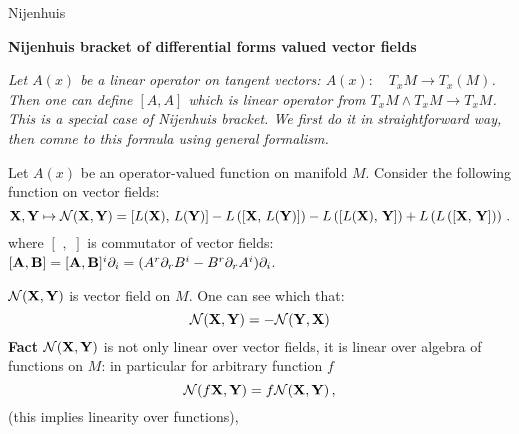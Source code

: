 Nijenhuis 

\baselineskip=14pt


\def\vare {\varepsilon}
\def\A {{\bf A}}
\def\B {{\bf B}}
\def\t {\tilde}
\def\a {\alpha}
\def\K {{\bf K}}
\def\N {{\bf N}}
\def\V {{\cal V}}
\def\L {{\cal L}}
\def\s {{\sigma}}
\def\S {{\Sigma}}
\def\s {{\sigma}}
\def\p{\partial}
\def\vare{{\varepsilon}}
\def\Q {{\bf Q}}
\def\O {{\bf O}}
\def\D {{\cal D}}
\def\G {{\Gamma}}
\def\C {{\bf C}}
\def\N {{\cal N}}
\def\Z {{\bf Z}}
\def\U  {{\cal U}}
\def\H {{\cal H}}
\def\R  {{\bf R}}
\def\S  {{\bf S}}
\def\E  {{\bf E}}
\def\l {\lambda}
\def\degree {{\bf {\rm degree}\,\,}}
\def \finish {${\,\,\vrule height1mm depth2mm width 8pt}$}
\def \m {\medskip}
\def\p {\partial}
\def\r {{\bf r}}
\def\v {{\bf v}}
\def\n {{\bf n}}
\def\t {{\bf t}}
\def\b {{\bf b}}
\def\c {{\bf c }}
\def\e{{\bf e}}
\def\ac {{\bf a}}
\def \X   {{\bf X}}
\def \Y   {{\bf Y}}
\def \x   {{\bf x}}
\def \y   {{\bf y}}
\def \G{{\cal G}}
\def\w{\omega}
\def\finish {${\,\,\vrule height1mm depth2mm width 8pt}$}


\centerline {\bf Nijenhuis bracket of differential 
     forms valued vector fields}


{\it Let $A(x)$ be a linear operator on tangent vectors: 
$A(x)\colon\quad T_xM\to T_x(M)$. Then one can define $[A,A]$
 which is linear operator from $T_xM\wedge T_x M\to T_xM$. 
This is a special case
of Nijenhuis bracket. We first do it in straightforward way, then
  comne to this formula using general formalism.}

  Let  $A(x)$ be an operator-valued function on manifold $M$. Consider
   the following function on vector fields:
                      $$
    \X,\Y\mapsto
 \N(\X,\Y)=         \left[L(\X),\,L(\Y)\right]-
                    L\left(\left[\X,\,L(\Y)\right]\right)-
                   L\left(\left[L(\X),\,\Y\right]\right)+
                      L\left(
                    L\left(
              \left[\X,\,\Y\right]
                    \right)
                     \right)\,.
                      $$
where $[\,\,,\,\,]$ is commutator of vector fields:
  $[\A,\B]=[\A,\B]^i\p_i=(A^r\p_r B^i-B^r\p_r A^i)\p_i$.

   $\N(\X,\Y)$ is vector field on $M$.  One can see  which that:
              $$
 \N(\X,\Y)=-\N(\Y,\X)
              $$
 {\bf Fact}   $\N(\X,\Y)$ is not only linear over vector fields, it is
linear over  algebra of functions on $M$:
  in particular for arbitrary function $f$
               $$
\N(f\X,\Y)=f\N(\X,\Y)\,,
               $$
(this implies linearity over functions),

